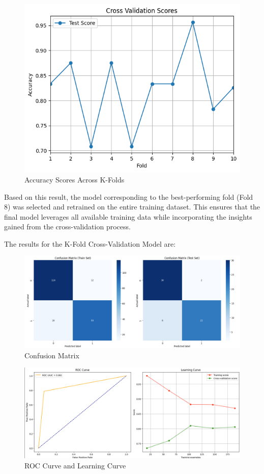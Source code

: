 \begin{figure}[H] \centering \includegraphics[width=0.75\linewidth]{images/k_fold_cross_mlp.png} \caption{Accuracy Scores Across K-Folds} \label{fig:k_fold_cross_svc.png} \end{figure}

Based on this result, the model corresponding to the best-performing fold (Fold 8) was selected and retrained on the entire training dataset. This ensures that the final model leverages all available training data while incorporating the insights gained from the cross-validation process.

The results for the K-Fold Cross-Validation Model are:

\begin{figure}[H]
    \centering
    \includegraphics[width=1\linewidth]{images/confusion_matrix_mlp_kfold.png}
    \caption{Confusion Matrix}
    \label{fig:enter-label}
\end{figure}
\begin{figure}[H]
    \centering
    \includegraphics[width=1\linewidth]{images/roc_learning_mlp_kfold.png}
    \caption{ROC Curve and Learning Curve}%
    \label{fig:enter-label}
\end{figure}

